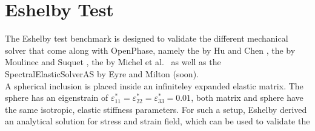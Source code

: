 \section{Eshelby Test}
\label{sec:example_eshelbytest}
The Eshelby test benchmark is designed to validate the different mechanical solver that come along with OpenPhase, namely the  by Hu and Chen , the  by Moulinec and Suquet , the  by Michel et al.\  as well as the SpectralElasticSolverAS by Eyre and Milton (soon).\\
A spherical inclusion is placed inside an infiniteley expanded elastic matrix. The sphere has an eigenstrain of $\varepsilon^*_{11} = \varepsilon^*_{22} = \varepsilon^*_{33} = 0.01$, both matrix and sphere have the same isotropic, elastic stiffness parameters. For such a setup, Eshelby  derived an analytical solution for stress and strain field, which can be used to validate the

